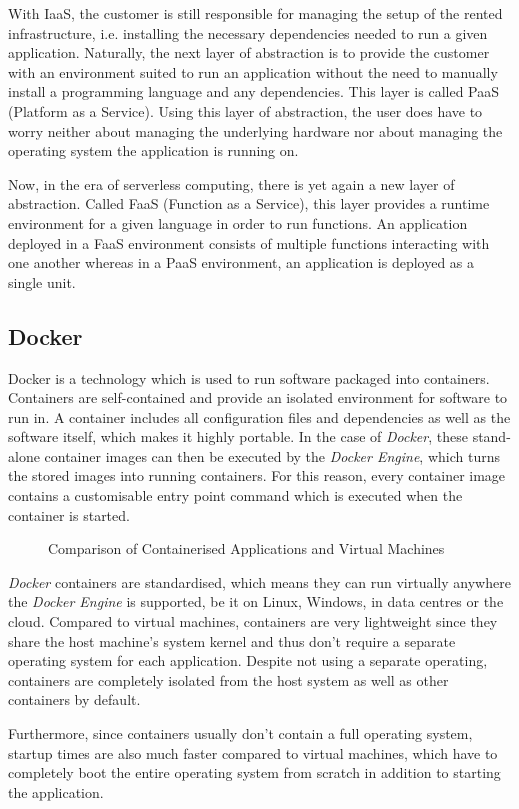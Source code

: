 With IaaS, the customer is still responsible for managing the setup of the rented infrastructure,
i.e. installing the necessary dependencies needed to run a given application. Naturally, the next
layer of abstraction is to provide the customer with an environment suited to run an application
without the need to manually install a programming language and any dependencies. This layer is
called PaaS (Platform as a Service). Using this layer of abstraction, the user does have to worry
neither about managing the underlying hardware nor about managing the operating system the
application is running on.

Now, in the era of serverless computing, there is yet again a new layer of abstraction. Called
FaaS (Function as a Service), this layer provides a runtime environment for a given language in
order to run functions. An application deployed in a FaaS environment consists of multiple
functions interacting with one another whereas in a PaaS environment, an application is deployed
as a single unit.

\subsection{Docker}

Docker is a technology which is used to run software packaged into containers. Containers are
self-contained and provide an isolated environment for software to run in. A container includes
all configuration files and dependencies as well as the software itself, which makes it highly
portable. In the case of \textit{Docker}, these stand-alone container images can then be executed
by the \textit{Docker Engine}, which turns the stored images into running containers. For this
reason, every container image contains a customisable entry point command which is executed when
the container is started.

\begin{figure}[H]
  \centering
  \caption{Comparison of Containerised Applications and Virtual Machines \cite{docker-container}}
\end{figure}

\textit{Docker} containers are standardised, which means they can run virtually anywhere the
\textit{Docker Engine} is supported, be it on Linux, Windows, in data centres or the cloud.
Compared to virtual machines, containers are very lightweight since they share the host machine's
system kernel and thus don't require a separate operating system for each application. Despite
not using a separate operating, containers are completely isolated from the host system as well as
other containers by default.

Furthermore, since containers usually don't contain a full operating system, startup times are
also much faster compared to virtual machines, which have to completely boot the entire operating
system from scratch in addition to starting the application. \cite{docker-container}
